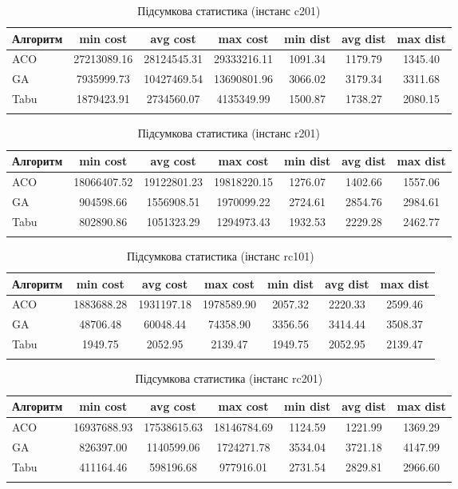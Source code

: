 \documentclass[12pt,a4paper]{article}
\begin{document}
\begin{longtable}{lcccccc}
\toprule
Алгоритм & min cost & avg cost & max cost & min dist & avg dist & max dist\\ 
\midrule
ACO  & 27213089.16  & 28124545.31  & 29333216.11 & 1091.34  & 1179.79   & 1345.40\\
GA   & 7935999.73    & 10427469.54  & 13690801.96 & 3066.02   & 3179.34  & 3311.68\\
Tabu & 1879423.91    & 2734560.07  & 4135349.99 & 1500.87  & 1738.27  & 2080.15\\
\bottomrule
\caption{Підсумкова статистика (інстанс c201)}
\end{longtable}

\begin{longtable}{lcccccc}
\toprule
Алгоритм & min cost & avg cost & max cost & min dist & avg dist & max dist\\ 
\midrule
ACO  & 18066407.52  & 19122801.23  & 19818220.15 & 1276.07  & 1402.66    & 1557.06\\
GA   & 904598.66     & 1556908.51   & 1970099.22 & 2724.61   & 2854.76   & 2984.61\\
Tabu & 802890.86     & 1051323.29  & 1294973.43 & 1932.53  & 2229.28   & 2462.77\\
\bottomrule
\caption{Підсумкова статистика (інстанс r201)}
\end{longtable}

\begin{longtable}{lcccccc}
\toprule
Алгоритм & min cost & avg cost & max cost & min dist & avg dist & max dist\\ 
\midrule
ACO  & 1883688.28    & 1931197.18  & 1978589.90 & 2057.32    & 2220.33  & 2599.46\\
GA   & 48706.48     & 60048.44   & 74358.90 & 3356.56   & 3414.44    & 3508.37\\
Tabu & 1949.75      & 2052.95   & 2139.47 & 1949.75   & 2052.95    & 2139.47\\
\bottomrule
\caption{Підсумкова статистика (інстанс rc101)}
\end{longtable}

\begin{longtable}{lcccccc}
\toprule
Алгоритм & min cost & avg cost & max cost & min dist & avg dist & max dist\\ 
\midrule
ACO  & 16937688.93    & 17538615.63   & 18146784.69 & 1124.59    & 1221.99   & 1369.29\\
GA   & 826397.00      & 1140599.06    & 1724271.78 & 3534.04    & 3721.18     & 4147.99\\
Tabu & 411164.46       & 598196.68    & 977916.01 & 2731.54    & 2829.81     & 2966.60\\
\bottomrule
\caption{Підсумкова статистика (інстанс rc201)}
\end{longtable}
\end{document}
